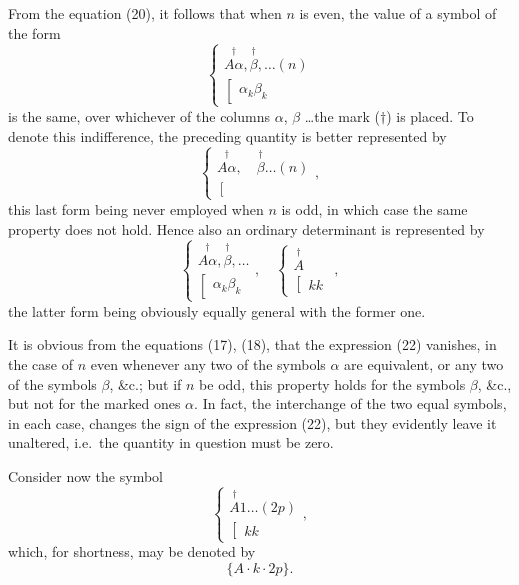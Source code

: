 \documentclass[11pt,a4paper]{book}
\begin{document}
From the equation (20), it follows that when $n$ is even, the value of a symbol
of the form
\[
\left\{\begin{array}{c}
\stackrel{\dagger}{A\alpha}, \stackrel{\dagger}{\beta}, \ldots (n) \\
\left[\begin{array}{c}
\alpha_k\beta_k
\end{array}\right.
\end{array}\right.
\tag{22}
\]
is the same, over whichever of the columns $\alpha$, $\beta$ \ldots the mark ($\dagger$) is placed. To
denote this indifference, the preceding quantity is better represented by
\[
\left\{\begin{array}{c}
\stackrel{\dagger}{A\alpha}, \quad \stackrel{\dagger}{\beta} \ldots (n) \\
\left[\begin{array}{c}
\\
\end{array}\right.
\end{array}\right.
\tag{23},
\]
this last form being never employed when $n$ is odd, in which case the same property
does not hold. Hence also an ordinary determinant is represented by
\[
\left\{\begin{array}{c}
\stackrel{\dagger}{A\alpha}, \stackrel{\dagger}{\beta}, \ldots \\
\left[\begin{array}{c}
\alpha_k\beta_k
\end{array}\right.
\end{array}\right.
, \quad
\left\{\begin{array}{c}
\stackrel{\dagger}{A} \\
\left[\begin{array}{c}
kk
\end{array}\right.
\end{array}\right.
\tag{24},
\]
the latter form being obviously equally general with the former one.

It is obvious from the equations (17), (18), that the expression (22) vanishes, in
the case of $n$ even whenever any two of the symbols $\alpha$ are equivalent, or any two
of the symbols $\beta$, \&c.; but if $n$ be odd, this property holds for the symbols $\beta$, \&c.,
but not for the marked ones $\alpha$. In fact, the interchange of the two equal symbols,
in each case, changes the sign of the expression (22), but they evidently leave it
unaltered, i.e.\ the quantity in question must be zero.

Consider now the symbol
\[
\left\{\begin{array}{c}
\stackrel{\dagger}{A} 1 \ldots (2p) \\
\left[\begin{array}{c}
kk
\end{array}\right.
\end{array}\right.
\tag{25},
\]
which, for shortness, may be denoted by
\[
\{A \cdot k \cdot 2p\}
\tag{26}.
\]
\end{document}
